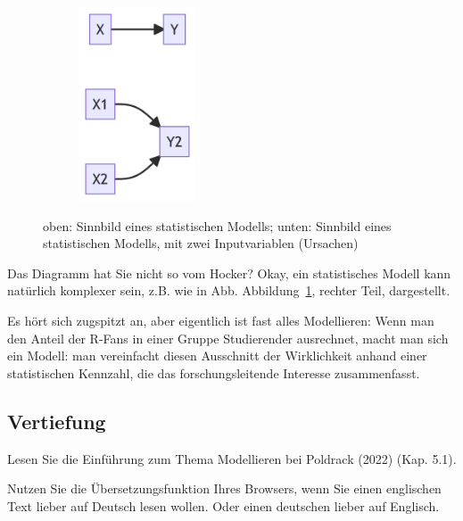 \documentclass[
  a4paper,
  DIV=11]{scrreprt}
\theoremstyle{definition}
\theoremstyle{remark}
\begin{document}
\begin{figure}

{\centering 

\begin{figure}[H]

{\centering \includegraphics[width=1.36in,height=2.26in]{./Inferenz_files/figure-latex/mermaid-figure-3.png}

}

\end{figure}

}

\caption{\label{fig-xy}oben: Sinnbild eines statistischen Modells;
unten: Sinnbild eines statistischen Modells, mit zwei Inputvariablen
(Ursachen)}

\end{figure}

Das Diagramm hat Sie nicht so vom Hocker? Okay, ein statistisches Modell
kann natürlich komplexer sein, z.B. wie in Abb. Abbildung~\ref{fig-xy},
rechter Teil, dargestellt.

Es hört sich zugspitzt an, aber eigentlich ist fast alles Modellieren:
Wenn man den Anteil der R-Fans in einer Gruppe Studierender ausrechnet,
macht man sich ein Modell: man vereinfacht diesen Ausschnitt der
Wirklichkeit anhand einer statistischen Kennzahl, die das
forschungsleitende Interesse zusammenfasst.

\hypertarget{vertiefung}{%
\subsection{Vertiefung}\label{vertiefung}}

Lesen Sie die Einführung zum Thema Modellieren bei Poldrack (2022) (Kap.
5.1).

\begin{tcolorbox}[enhanced jigsaw, title=\textcolor{quarto-callout-note-color}{\faInfo}\hspace{0.5em}{Hinweis}, bottomtitle=1mm, bottomrule=.15mm, titlerule=0mm, colbacktitle=quarto-callout-note-color!10!white, colframe=quarto-callout-note-color-frame, leftrule=.75mm, left=2mm, toprule=.15mm, colback=white, arc=.35mm, breakable, toptitle=1mm, opacityback=0, rightrule=.15mm, coltitle=black, opacitybacktitle=0.6]

Nutzen Sie die Übersetzungsfunktion Ihres Browsers, wenn Sie einen
englischen Text lieber auf Deutsch lesen wollen. Oder einen deutschen
lieber auf Englisch.

\end{tcolorbox}
\end{document}
